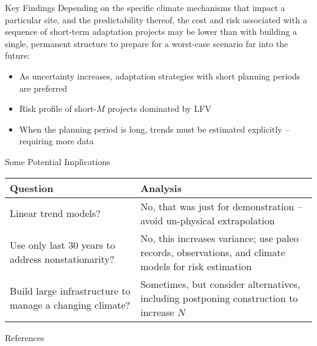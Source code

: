 \documentclass[
  10pt,     %
]{beamer}
\begin{document}
\begin{frame}{Key Findings}
  Depending on the specific climate mechanisms that impact a particular site, and the predictability thereof, the cost and risk associated with a sequence of short-term adaptation projects may be lower than with building a single, permanent structure to prepare for a worst-case scenario far into the future:
  \begin{itemize}
      \item As uncertainty increases, adaptation strategies with short planning periods are preferred
      \item Risk profile of short-$M$ projects dominated by LFV \citep{Jain:2001hz, Hodgkins:2017hw}
      \item When the planning period is long, trends must be estimated explicitly -- requiring more data
  \end{itemize}
\end{frame}

\begin{frame}{Some Potential Implications}
  \begin{table}
    \begin{tabular}{L{0.425\textwidth}L{0.525\textwidth}}
      \toprule
      Question & Analysis \\\midrule
      Linear trend models? & No, that was just for demonstration -- avoid un-physical extrapolation \\\midrule
      Use only last 30 years to address nonstationarity? & No, this increases variance; use paleo records, observations, and climate models for risk estimation \\\midrule
      Build large infrastructure to manage a changing climate? & Sometimes, but consider alternatives, including postponing construction to increase $N$\\
      \bottomrule
    \end{tabular}
  \end{table}
\end{frame}


\begin{frame}[allowframebreaks]{References}
  \renewcommand*{\bibfont}{\footnotesize}
  \renewcommand{\bibsection}{}
  \nocite{DossGollin:TjTkb07T}
	
  
\end{frame}
\end{document}
